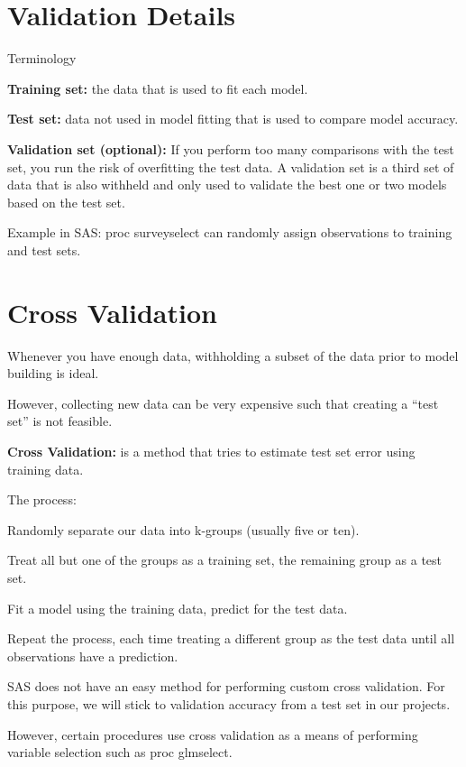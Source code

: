 \documentclass[12pt]{../notes}
\begin{document}
\section{Validation Details}
Terminology
\bi
\item \textbf{Training set:} the data that is used to fit each model. 
\item \textbf{Test set:} data not used in model fitting that is used to compare model accuracy. 
\item \textbf{Validation set (optional):} If you perform too many comparisons with the test set, you run the risk of overfitting the test data. A validation set is a third set of data that is also withheld and only used to validate the best one or two models based on the test set. 
\ei

Example in SAS: proc surveyselect can randomly assign observations to training and test sets. 

\section{Cross Validation}
Whenever you have enough data, withholding a subset of the data prior to model building is ideal. 

\nspace
However, collecting new data can be very expensive such that creating a ``test set'' is not feasible. 

\textbf{Cross Validation:} is a method that tries to estimate test set error using training data. 

\nspace The process:
\bi 
\item Randomly separate our data into k-groups (usually five or ten). 
\item Treat all but one of the groups as a training set, the remaining group as a test set. 
\item Fit a model using the training data, predict for the test data. 
\item Repeat the process, each time treating a different group as the test data until all observations have a prediction. 
\ei

\nspace
SAS does not have an easy method for performing custom cross validation. For this purpose, we will stick to validation accuracy from a test set in our projects. 

\nspace
However, certain procedures use cross validation as a means of performing variable selection such as proc glmselect. 
\end{document}
